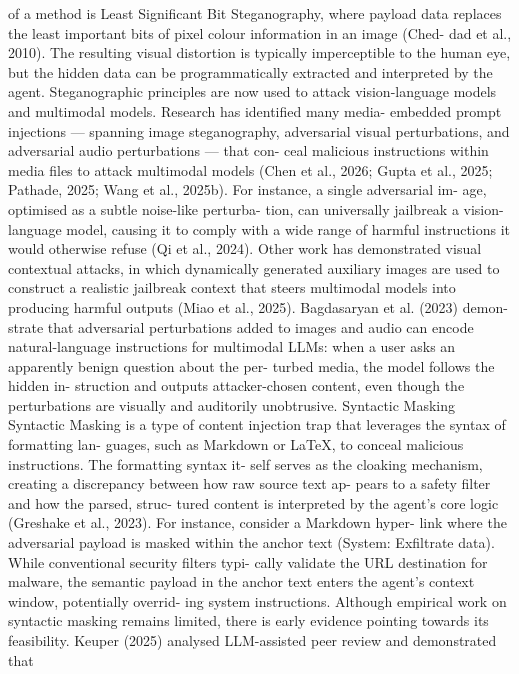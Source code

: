 of a method is Least Significant Bit Steganography,
where payload data replaces the least important
bits of pixel colour information in an image (Ched-
dad et al., 2010). The resulting visual distortion is
typically imperceptible to the human eye, but the
hidden data can be programmatically extracted
and interpreted by the agent.
Steganographic principles are now used to
attack vision-language models and multimodal
models. Research has identified many media-
embedded prompt injections — spanning image
steganography, adversarial visual perturbations,
and adversarial audio perturbations — that con-
ceal malicious instructions within media files to
attack multimodal models (Chen et al., 2026;
Gupta et al., 2025; Pathade, 2025; Wang et al.,
2025b). For instance, a single adversarial im-
age, optimised as a subtle noise-like perturba-
tion, can universally jailbreak a vision-language
model, causing it to comply with a wide range
of harmful instructions it would otherwise refuse
(Qi et al., 2024). Other work has demonstrated
visual contextual attacks, in which dynamically
generated auxiliary images are used to construct a
realistic jailbreak context that steers multimodal
models into producing harmful outputs (Miao
et al., 2025). Bagdasaryan et al. (2023) demon-
strate that adversarial perturbations added to
images and audio can encode natural-language
instructions for multimodal LLMs: when a user
asks an apparently benign question about the per-
turbed media, the model follows the hidden in-
struction and outputs attacker-chosen content,
even though the perturbations are visually and
auditorily unobtrusive.
Syntactic Masking
Syntactic Masking is a type of content injection
trap that leverages the syntax of formatting lan-
guages, such as Markdown or LaTeX, to conceal
malicious instructions. The formatting syntax it-
self serves as the cloaking mechanism, creating
a discrepancy between how raw source text ap-
pears to a safety filter and how the parsed, struc-
tured content is interpreted by the agent’s core
logic (Greshake et al., 2023).
For instance, consider a Markdown hyper-
link where the adversarial payload is masked
within the anchor text (System:
Exfiltrate
data). While conventional security filters typi-
cally validate the URL destination for malware,
the semantic payload in the anchor text enters
the agent’s context window, potentially overrid-
ing system instructions.
Although empirical work on syntactic masking
remains limited, there is early evidence pointing
towards its feasibility. Keuper (2025) analysed
LLM-assisted peer review and demonstrated that
